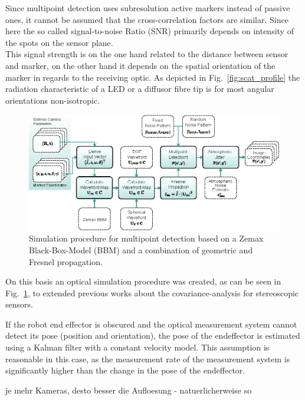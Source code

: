 \documentclass[5p,times,procedia]{elsarticle}
\begin{document}
Since multipoint detection \cite{Haist2015} uses subresolution active markers instead of passive ones, it cannot be assumed that the cross-correlation factors are similar. Since here the so called signal-to-noise Ratio (SNR) primarily depends on intensity of the spots on the sensor plane. \\
This signal strength is on the one hand related to the distance between sensor and marker, on the other hand it depends on the spatial orientation of the marker in regards to the receiving optic. As depicted in Fig.~\ref{fig:scat_profile}
the radiation characteristic of a LED or a diffusor fibre tip \cite{Pan1994} is for most angular orientations non-isotropic.\\

\begin{figure}[!htb]
	\centering
	\includegraphics[width=\columnwidth]{graphics/OpticalSimulation.eps}
	\caption{Simulation procedure for multipoint detection based on a Zemax Black-Box-Model (BBM) and a combination of geometric and Fresnel propagation.}
	\label{fig:opto-sim}
\end{figure}

On this basis an optical simulation procedure was created, as can be seen in Fig.~\ref{fig:opto-sim}, to extended previous works \cite{Liu_2021,Di_Leo_2011} about the covariance-analysis for stereoscopic sensors.





If the robot end effector is obscured and the optical measurement system cannot detect its pose (position and orientation), the pose of the endeffector is estimated using a Kalman filter with a constant velocity model. This assumption is reasonable in this case, as the measurement rate of the measurement system is significantly higher than the change in the pose of the endeffector.

je mehr Kameras, desto besser die Aufloesung
- natuerlicherweise so
\end{document}
